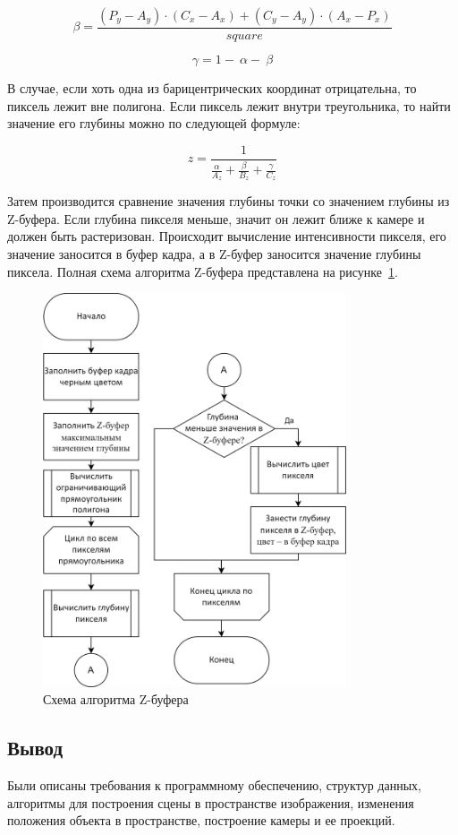 \begin{equation}
	\beta=\frac{\left(P_y-A_y\right)\cdot\left(C_x-A_x\right)+\left(C_y-A_y\right)\cdot\left(A_x-P_x\right)}{square}
\end{equation}

\begin{equation}
	\gamma=1-\ \alpha-\ \beta
\end{equation}

В случае, если хоть одна из барицентрических координат отрицательна, то пиксель лежит вне полигона. Если пиксель лежит внутри треугольника, то найти значение его глубины можно по следующей формуле:

\begin{equation}
	z=\frac{1}{\frac{\alpha}{A_z}+\frac{\beta}{B_z}+\frac{\gamma}{C_z}}
\end{equation}

Затем производится сравнение значения глубины точки со значением глубины из Z-буфера. Если глубина пикселя меньше, значит он лежит ближе к камере и должен быть растеризован. Происходит вычисление интенсивности пикселя, его значение заносится в буфер кадра, а в Z-буфер заносится значение глубины пиксела. Полная схема алгоритма Z-буфера представлена на 
рисунке~\ref{fig:z-buffer}.

\begin{figure}[h]
	\centering
	\includegraphics[width=0.8\textwidth]{img/algorithms/alg-z-buffer.png}
	\caption{Схема алгоритма Z-буфера}
	\label{fig:z-buffer}
\end{figure}

\subsection*{Вывод}
Были описаны требования к программному обеспечению, структур данных, алгоритмы для построения сцены в пространстве изображения, изменения положения объекта в пространстве, построение камеры и ее проекций.